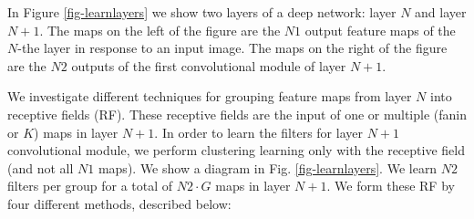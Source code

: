 \documentclass{article} %
\begin{document}
In Figure \ref{fig-learnlayers} we show two layers of a deep network: layer $N$ and layer $N+1$.
The maps on the left of the figure are the $N1$ output feature maps of the $N$-the layer in response to an input image.
The maps on the right of the figure are the $N2$ outputs of the first convolutional module of layer $N+1$. 

We investigate different techniques for grouping feature maps from layer $N$ into receptive fields (RF).
These receptive fields are the input of one or multiple (fanin or $K$) maps in layer $N+1$. In order to learn the filters for layer $N+1$ convolutional module, we perform clustering learning only with the receptive field (and not all $N1$ maps). We show a diagram in Fig. \ref{fig-learnlayers}. We learn $N2$ filters per group for a total of $N2 \cdot G$ maps in layer $N+1$.
We form these RF by four different methods, described below:
\end{document}
